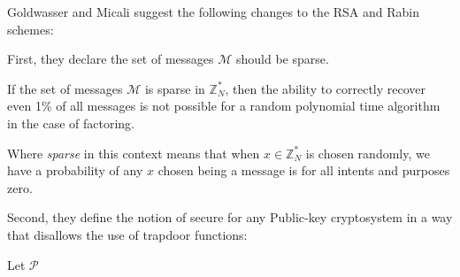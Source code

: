 Goldwasser and Micali suggest the following changes to the RSA and Rabin schemes:


First, they declare the set of messages $\mathcal{M}$ should be sparse.

\begin{cla}
    If the set of messages $\mathcal{M}$ is sparse in $\mathbb{Z}_{N}^{*}$, then the ability to correctly recover even 1\% of all messages is not possible for a random polynomial time algorithm in the case of factoring.
\end{cla}

Where \emph{sparse} in this context means that when $x \in \mathbb{Z}_{N}^{*}$ is chosen randomly, we have a probability of any $x$ chosen being a message is for all intents and purposes zero. 


Second, they define the notion of secure for any Public-key cryptosystem in a way that disallows the use of trapdoor functions:

\begin{defn}
    Let $\mathcal{P}$ 
\end{defn}
